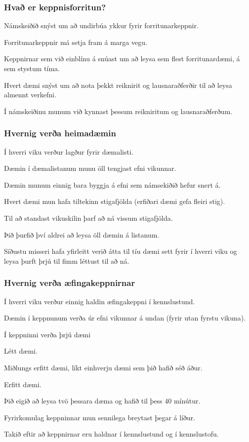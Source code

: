 {
    \frametitle{Hvað er keppnisforritun?}
    {
        \item<1-> Námskeiðið snýst um að undirbúa ykkur fyrir forritunarkeppnir.
        \item<2-> Forritunarkeppnir má setja fram á marga vegu.
        \item<3-> Keppnirnar sem við einblínu á snúast um að leysa sem flest forritunardæmi, á sem stystum tíma.
        \item<4-> Hvert dæmi snýst um að nota þekkt reiknirit og lausnaraðferðir til að leysa almennt verkefni.
        \item<5-> Í námskeiðinu munum við kynnast þessum reikniritum og lausnaraðferðum.
    }
}

{
    \frametitle{Hvernig verða heimadæmin}
    {
        \item<1-> Í hverri viku verður lagður fyrir dæmalisti.
        \item<2-> Dæmin í dæmalistanum munu öll tengjast efni vikunnar.
        \item<3-> Dæmin munum einnig bara byggja á efni sem námsekiðið hefur snert á.
        \item<4-> Hvert dæmi mun hafa tiltekinn stigafjölda (erfiðari dæmi gefa fleiri stig).
        \item<5-> Til að standast vikuskilin þarf að ná vissum stigafjölda.
        \item<6-> Þið þurfið því aldrei að leysa öll dæmin á listanum.
        \item<7-> Síðustu misseri hafa yfirleitt verið átta til tíu dæmi sett fyrir í hverri viku og leysa þurft þrjú til fimm léttust til að ná.
    }
}

{
    \frametitle{Hvernig verða æfingakeppnirnar}
    {
        \item<1-> Í hverri viku verður einnig haldin æfingakeppni í kennslustund.
        \item<2-> Dæmin í keppnunum verða úr efni vikunnar á undan (fyrir utan fyrstu vikuna).
        \item<3-> Í keppninni verða þrjú dæmi
        {
            \item<4-> Létt dæmi.
            \item<5-> Miðlungs erfitt dæmi, líkt einhverju dæmi sem þið hafið séð áður.
            \item<6-> Erfitt dæmi.
        }
        \item<7-> Þið eigið að leysa tvö þessara dæma og hafið til þess $40$ mínútur.
        \item<8-> Fyrirkomulag keppninnar mun sennilega breytast þegar á líður.
        \item<9-> Takið eftir að keppnirnar eru haldnar í kennslustund og í kennslustofu.
    }
}

